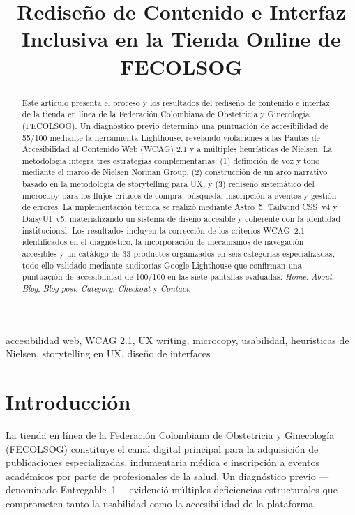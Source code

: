 \documentclass[conference]{IEEEtran}
\title{Rediseño de Contenido e Interfaz Inclusiva en la Tienda Online de FECOLSOG}
\author{
\IEEEauthorblockN{Jota Emilio López Ramírez \quad Esmeralda Rivas Guzmán}
\IEEEauthorblockA{Universidad del Valle\\
Ingeniería de Sistemas\\
Tuluá, Colombia}
}
\begin{document}
\maketitle

\begin{abstract}
Este artículo presenta el proceso y los resultados del rediseño de contenido e interfaz de la tienda en línea de la Federación Colombiana de Obstetricia y Ginecología (FECOLSOG). Un diagnóstico previo determinó una puntuación de accesibilidad de 55/100 mediante la herramienta Lighthouse, revelando violaciones a las Pautas de Accesibilidad al Contenido Web (WCAG) 2.1 y a múltiples heurísticas de Nielsen. La metodología integra tres estrategias complementarias: (1) definición de voz y tono mediante el marco de Nielsen Norman Group, (2) construcción de un arco narrativo basado en la metodología de storytelling para UX, y (3) rediseño sistemático del microcopy para los flujos críticos de compra, búsqueda, inscripción a eventos y gestión de errores. La implementación técnica se realizó mediante Astro~5, Tailwind CSS~v4 y DaisyUI~v5, materializando un sistema de diseño accesible y coherente con la identidad institucional. Los resultados incluyen la corrección de los criterios WCAG~2.1 identificados en el diagnóstico, la incorporación de mecanismos de navegación accesibles y un catálogo de 33 productos organizados en seis categorías especializadas, todo ello validado mediante auditorías Google Lighthouse que confirman una puntuación de accesibilidad de 100/100 en las siete pantallas evaluadas: \textit{Home}, \textit{About}, \textit{Blog}, \textit{Blog post}, \textit{Category}, \textit{Checkout} y \textit{Contact}.
\end{abstract}

\begin{IEEEkeywords}
accesibilidad web, WCAG 2.1, UX writing, microcopy, usabilidad, heurísticas de Nielsen, storytelling en UX, diseño de interfaces
\end{IEEEkeywords}

\section{Introducción}

La tienda en línea de la Federación Colombiana de Obstetricia y Ginecología (FECOLSOG) \cite{sitio-web} constituye el canal digital principal para la adquisición de publicaciones especializadas, indumentaria médica e inscripción a eventos académicos por parte de profesionales de la salud. Un diagnóstico previo —denominado Entregable~1— evidenció múltiples deficiencias estructurales que comprometen tanto la usabilidad como la accesibilidad de la plataforma.
\end{document}
